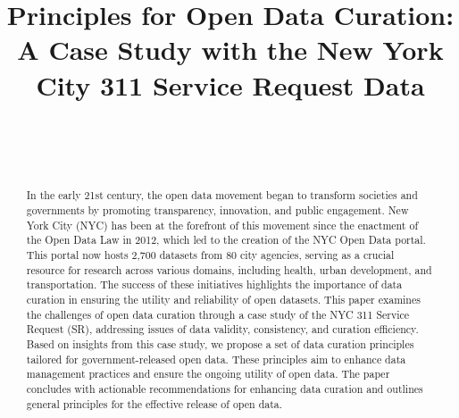\documentclass[linenumber]{jdsart}
\begin{document}
\begin{frontmatter}
  
\title{Principles for Open Data Curation: A Case Study with the New
York City 311 Service Request Data}

\author[1]{~}
\author[2]{~}
\address[1]{, }
\address[2]{Department of Statistics,
  , }



 \tableofcontents %
 \listoffigures %
 \listoftables %


\begin{abstract}
In the early 21st century, the open data movement began to transform 
societies and governments by promoting transparency,
innovation, and public engagement. New York City (NYC) has been at
the forefront of this movement since the enactment of the Open 
Data Law in 2012, which led to the creation of the NYC Open Data
portal. This portal now hosts 2,700 datasets from 80 city agencies,
serving as a crucial resource for research across various domains, 
including health, urban development, and transportation. The 
success of these initiatives highlights the importance of data 
curation in ensuring the utility and reliability of open datasets.
This paper examines the challenges of open data curation through a
case study of the NYC 311 Service Request (SR), addressing issues 
of data validity, consistency, and curation efficiency. Based on 
insights from this case study, we propose a set of data curation 
principles tailored for government-released open data. These principles 
aim to enhance data management practices and ensure 
the ongoing utility of open data. The paper concludes with 
actionable recommendations for enhancing data curation and outlines
general principles for the effective release of open data.

\end{abstract}

\begin{keywords}
\end{keywords}

\end{frontmatter}
\end{document}
